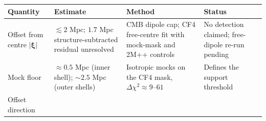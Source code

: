 \documentclass[
]{article}
\begin{document}
\begin{longtable}[]{@{}llll@{}}
\toprule
\begin{minipage}[b]{0.22\columnwidth}\raggedright
Quantity\strut
\end{minipage} & \begin{minipage}[b]{0.22\columnwidth}\raggedright
Estimate\strut
\end{minipage} & \begin{minipage}[b]{0.22\columnwidth}\raggedright
Method\strut
\end{minipage} & \begin{minipage}[b]{0.22\columnwidth}\raggedright
Status\strut
\end{minipage}\tabularnewline
\midrule
\endhead
\begin{minipage}[t]{0.22\columnwidth}\raggedright
Offset from centre \(|\boldsymbol{\xi}|\)\strut
\end{minipage} & \begin{minipage}[t]{0.22\columnwidth}\raggedright
\(\lesssim 2\) Mpc; \(1.7\) Mpc structure-subtracted residual
unresolved\strut
\end{minipage} & \begin{minipage}[t]{0.22\columnwidth}\raggedright
CMB dipole cap; CF4 free-centre fit with mock-mask and 2M++
controls\strut
\end{minipage} & \begin{minipage}[t]{0.22\columnwidth}\raggedright
No detection claimed; free-dipole re-run pending\strut
\end{minipage}\tabularnewline
\begin{minipage}[t]{0.22\columnwidth}\raggedright
Mock floor\strut
\end{minipage} & \begin{minipage}[t]{0.22\columnwidth}\raggedright
\(\approx 0.5\) Mpc (inner shell); \(\sim\!2.5\) Mpc (outer
shells)\strut
\end{minipage} & \begin{minipage}[t]{0.22\columnwidth}\raggedright
Isotropic mocks on the CF4 mask,
\(\Delta\chi^2 \approx 9\)--\(61\)\strut
\end{minipage} & \begin{minipage}[t]{0.22\columnwidth}\raggedright
Defines the support threshold\strut
\end{minipage}\tabularnewline
\begin{minipage}[t]{0.22\columnwidth}\raggedright
Offset direction\strut
\end{minipage} & \begin{minipage}[t]{0.22\columnwidth}\raggedright

\end{minipage}
\end{longtable}
\end{document}
